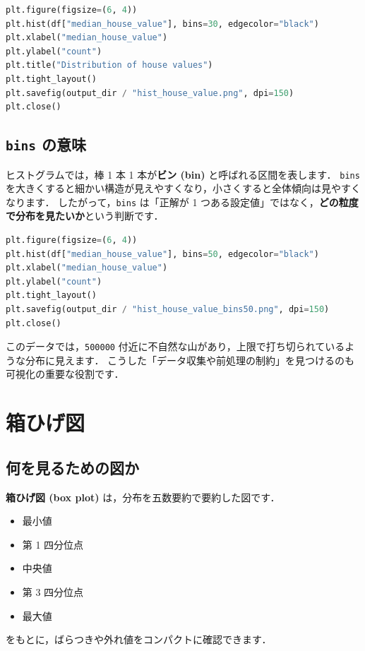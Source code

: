 \begin{lstlisting}[style=codecell,language=Python]
plt.figure(figsize=(6, 4))
plt.hist(df["median_house_value"], bins=30, edgecolor="black")
plt.xlabel("median_house_value")
plt.ylabel("count")
plt.title("Distribution of house values")
plt.tight_layout()
plt.savefig(output_dir / "hist_house_value.png", dpi=150)
plt.close()
\end{lstlisting}


\subsection{\texttt{bins} の意味}

ヒストグラムでは，棒 1 本 1 本が\textbf{ビン (bin)} と呼ばれる区間を表します．
\texttt{bins} を大きくすると細かい構造が見えやすくなり，小さくすると全体傾向は見やすくなります．
したがって，\texttt{bins} は「正解が 1 つある設定値」ではなく，\textbf{どの粒度で分布を見たいか}という判断です．

\begin{lstlisting}[style=codecell,language=Python]
plt.figure(figsize=(6, 4))
plt.hist(df["median_house_value"], bins=50, edgecolor="black")
plt.xlabel("median_house_value")
plt.ylabel("count")
plt.tight_layout()
plt.savefig(output_dir / "hist_house_value_bins50.png", dpi=150)
plt.close()
\end{lstlisting}


このデータでは，\texttt{500000} 付近に不自然な山があり，上限で打ち切られているような分布に見えます．
こうした「データ収集や前処理の制約」を見つけるのも可視化の重要な役割です．


\section{箱ひげ図}

\subsection{何を見るための図か}

\textbf{箱ひげ図 (box plot)} は，分布を五数要約で要約した図です．
\begin{itemize}
\item 最小値
\item 第 1 四分位点
\item 中央値
\item 第 3 四分位点
\item 最大値
\end{itemize}
をもとに，ばらつきや外れ値をコンパクトに確認できます．

